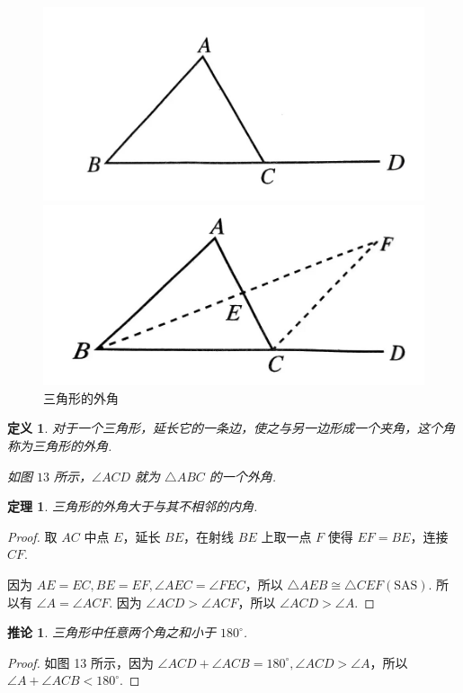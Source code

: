 \documentclass[a4paper]{article}
\newtheorem{theorem}{定理}[section]
\newtheorem{corollary}{推论}[section]
\newtheorem{definition}{定义}[section]
\begin{document}
\begin{figure}[htbp]
    \centering
    \begin{minipage}{0.4\textwidth}
        \centering
        \includegraphics[width=0.5\linewidth]{Pictures/O3-1.jpg}
    \end{minipage}
    \begin{minipage}{0.4\textwidth}
        \centering
        \includegraphics[width=0.5\linewidth]{Pictures/O3-2.jpg}
    \end{minipage}
    \caption{三角形的外角}
\end{figure}

\begin{definition}
    对于一个三角形，延长它的一条边，使之与另一边形成一个夹角，这个角称为三角形的外角.

    如图 $13$ 所示，$\angle ACD$ 就为 $\triangle ABC$ 的一个外角. 
\end{definition}

\begin{theorem}
    三角形的外角大于与其不相邻的内角.
\end{theorem}

\begin{proof}
    取 $AC$ 中点 $E$，延长 $BE$，在射线 $BE$ 上取一点 $F$ 使得 $EF=BE$，连接 $CF$.

    因为 $AE=EC,BE=EF,\angle AEC=\angle FEC$，所以 $\triangle AEB\cong \triangle CEF(\text{SAS})$.
    所以有 $\angle A=\angle ACF$. 因为 $\angle ACD>\angle ACF$，所以 $\angle ACD>\angle A$.
\end{proof}

\begin{corollary}
    三角形中任意两个角之和小于 $180^\circ$.
\end{corollary}

\begin{proof}
    如图 13 所示，因为 $\angle ACD+\angle ACB=180^\circ,\angle ACD>\angle A$，所以 $\angle A+\angle ACB
    < 180^\circ$.
\end{proof}
\end{document}
